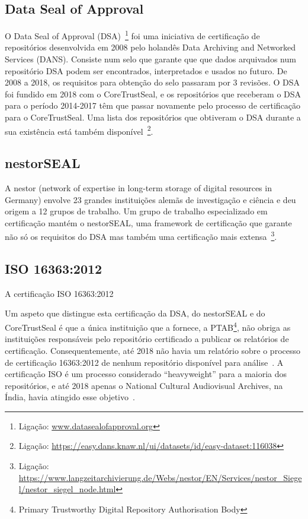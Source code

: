 \documentclass[sigconf,nonacm]{acmart}
\begin{document}
\subsection{Data Seal of Approval} %
\label{sub:data_seal_of_approval}

O Data Seal of Approval (DSA)~\footnote{Ligação: \url{www.datasealofapproval.org}} foi uma iniciativa de certificação de repositórios desenvolvida em 2008 pelo holandês Data Archiving and Networked Services (DANS). Consiste num selo que garante que que dados arquivados num repositório DSA podem ser encontrados, interpretados e usados no futuro. De 2008 a 2018, os requisitos para obtenção do selo passaram por 3 revisões. O DSA foi fundido em 2018 com o CoreTrustSeal, e os repositórios que receberam o DSA para o período 2014-2017 têm que passar novamente pelo processo de certificação para o CoreTrustSeal. Uma lista dos repositórios que obtiveram o DSA durante a sua existência está também disponível~\footnote{Ligação: \url{https://easy.dans.knaw.nl/ui/datasets/id/easy-dataset:116038}}.


\subsection{nestorSEAL} %
\label{sub:nestorseal}

A nestor (network of expertise in long-term storage of digital resources in Germany) envolve 23 grandes instituições alemãs de investigação e ciência e deu origem a 12 grupos de trabalho. Um grupo de trabalho especializado em certificação mantém o nestorSEAL, uma framework de certificação que garante não só os requisitos do DSA mas também uma certificação mais extensa~\footnote{Ligação: \url{https://www.langzeitarchivierung.de/Webs/nestor/EN/Services/nestor_Siegel/nestor_siegel_node.html}}. 


\subsection{ISO 16363:2012} %
\label{sub:iso_16363_2012}


A certificação ISO 16363:2012

Um aspeto que distingue esta certificação da DSA, do nestorSEAL e do CoreTrustSeal é que a única instituição que a fornece, a PTAB\footnote{Primary Trustworthy Digital Repository Authorisation Body}, não obriga as instituições responsáveis pelo repositório certificado a publicar os relatórios de certificação. Consequentemente, até 2018 não havia um relatório sobre o processo de certificação 16363:2012 de nenhum repositório disponível para análise~\cite{Lindlar_Schwab_2019}. A certificação ISO é um processo considerado ``heavyweight'' para a maioria dos repositórios, e até 2018 apenas o National Cultural Audiovisual Archives, na Índia, havia atingido esse objetivo~\cite{Lindlar_Schwab_2019,IndianMinistryofCulture2017}.
\end{document}
